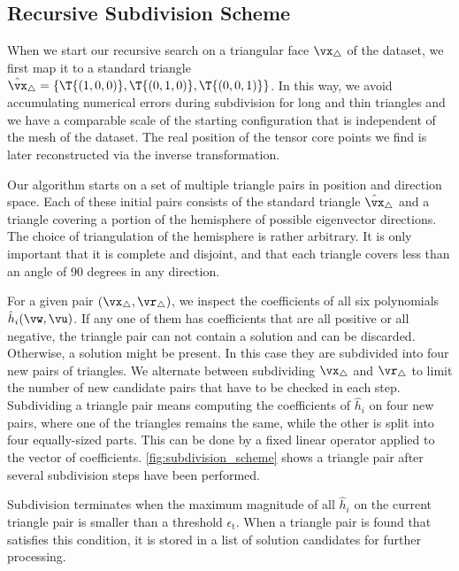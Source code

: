 \subsection{Recursive Subdivision Scheme} %
\label{sub:recursive_subdivision_scheme}
%
When we start our recursive search on a triangular face $\vx_\triangle$ of the
dataset, we first map it to a standard triangle
$\hat\vx_\triangle = \{\T{(1, 0, 0)}, \T{(0,1,0)}, \T{(0, 0, 1)}\}$.
%
In this way, we avoid accumulating numerical errors during subdivision for long
and thin triangles and we have a comparable scale of the starting configuration
that is independent of the mesh of the dataset.
% 
The real position of the tensor core points we find is later reconstructed via
the inverse transformation.
%

%
Our algorithm starts on a set of multiple triangle pairs in position and
direction space.
%
Each of these initial pairs consists of the standard triangle
$\hat\vx_\triangle$ and a triangle covering a portion of the hemisphere of
possible eigenvector directions.
% 
The choice of triangulation of the hemisphere is rather arbitrary.
% 
It is only important that it is complete and disjoint, and that each triangle
covers less than an angle of 90 degrees in any direction.
% 

% 
For a given pair $(\vx_\triangle, \vr_\triangle)$, we inspect the coefficients
of all six polynomials $\hat{h}_i(\vw, \vu)$.
%
If any one of them has coefficients that are all positive or all negative, the
triangle pair can not contain a solution and can be discarded.
%
Otherwise, a solution might be present.
%
In this case they are subdivided into four new pairs of triangles.
%
We alternate between subdividing $\vx_\triangle$ and $\vr_\triangle$ to limit
the number of new candidate pairs that have to be checked in each step.
%
Subdividing a triangle pair means computing the coefficients of $\hat{h}_i$ on
four new pairs, where one of the triangles remains the same, while the other is
split into four equally-sized parts.
%
This can be done by a fixed linear operator applied to the vector of
coefficients.
%
\autoref{fig:subdivision_scheme} shows a triangle pair after several subdivision
steps have been performed.
%



%
Subdivision terminates when the maximum magnitude of all $\hat{h}_i$ on the
current triangle pair is smaller than a threshold $\epsilon_{\mathrm{t}}$.
%
When a triangle pair is found that satisfies this condition, it is stored in a
list of solution candidates for further processing.
%

